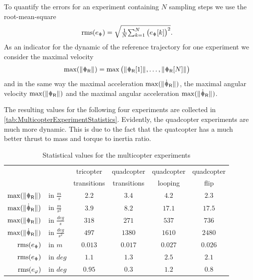 To quantify the errors for an experiment containing $N$ sampling steps we use the root-mean-square
\begin{align}
 \RMS(e_{\r}) = \sqrt{ \tfrac{1}{N} \textstyle{\sum_{k=1}^{N} \big( e_{\r}[k] \big)^2} }.
\end{align}
As an indicator for the dynamic of the reference trajectory for one experiment we consider the maximal velocity
\begin{align}
 \max(\norm{\vR}) = \max\big( \norm{\vR[1]}, \ldots, \norm{\vR[N]} \big)
\end{align}
and in the same way the maximal acceleration $\max(\norm{\vRd})$, the maximal angular velocity $\max(\norm{\wR})$ and the maximal angular acceleration $\max(\norm{\wRd})$.

The resulting values for the following four experiments are collected in \autoref{tab:MulticopterExperimentStatistics}.
Evidently, the quadcopter experiments are much more dynamic.
This is due to the fact that the quatcopter has a much better thrust to mass and torque to inertia ratio.

\begin{table}[htb]
 \centering
 \setlength{\tabcolsep}{.1em}
 \begin{tabular}{rlcccc}
  \toprule
   && \quad tricopter\quad & \quad quadcopter\quad & \quad quadcopter\quad & \quad quadcopter\quad \\
   && \quad transitions \quad & \quad transitions \quad & \quad looping \quad & \quad flip \quad \\
  \midrule
  $\max(\norm{\vR})$  &in $\tfrac{\unit{m}}{\unit{s}}$     & $2.2$   & $3.4$   & $4.2$   & $2.3$ \\[.5ex]
  $\max(\norm{\vRd})$ &in $\tfrac{\unit{m}}{\unit{s}^2}$   & $3.9$   & $8.2$   & $17.1$   & $17.5$ \\[.5ex]
  $\max(\norm{\wR})$  &in $\tfrac{\unit{deg}}{\unit{s}}$   & $318$   & $271$   & $537$   & $736$ \\[.5ex]
  $\max(\norm{\wRd})$ &in $\tfrac{\unit{deg}}{\unit{s}^2}$ & $497$   & $1380$  & $1610$  & $2480$ 
  \\[1ex]
  $\RMS(e_{\r})$      &in $\unit{m}$                       & $0.013$ & $0.017$ & $0.027$ & $0.026$ \\[.5ex]
  $\RMS(e_{\R})$      &in $\unit{deg}$                     & $1.1$   & $1.3$   & $2.5$   & $2.1$   \\[.5ex]
  $\operatorname{rms}(e_{\varphi})$   &in $\unit{deg}$                     & $0.95$  & $0.3$   & $1.2$   & $0.8$   \\
  \bottomrule
 \end{tabular}
 \caption{Statistical values for the multicopter experiments}
 \label{tab:MulticopterExperimentStatistics}
\end{table}


